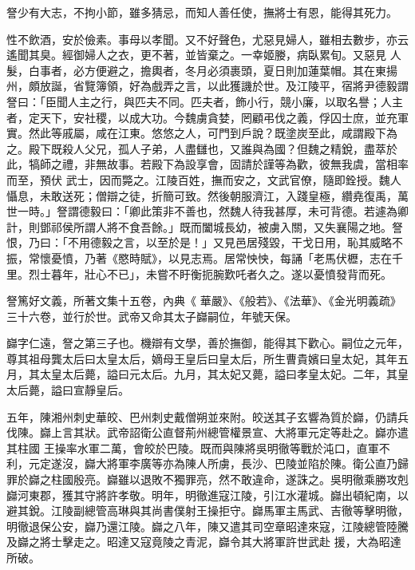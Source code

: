 \begin{pinyinscope}
 詧少有大志，不拘小節，雖多猜忌，而知人善任使，撫將士有恩，能得其死力。



 性不飲酒，安於儉素。事母以孝聞。又不好聲色，尤惡見婦人，雖相去數步，亦云遙聞其臭。經御婦人之衣，更不著，並皆棄之。一幸姬媵，病臥累旬。又惡見
 人髮，白事者，必方便避之，擔輿者，冬月必須裹頭，夏日則加蓮葉帽。其在東揚州，頗放誕，省覽簿領，好為戲弄之言，以此獲譏於世。及江陵平，宿將尹德毅謂詧曰：「臣聞人主之行，與匹夫不同。匹夫者，飾小行，競小廉，以取名譽；人主者，定天下，安社稷，以成大功。今魏虜貪婪，罔顧弔伐之義，俘囚士庶，並充軍實。然此等戚屬，咸在江東。悠悠之人，可門到戶說？既塗炭至此，咸謂殿下為之。殿下既殺人父兄，孤人子弟，人盡讎也，又誰與為國？但魏之精銳，盡萃於此，犒師之禮，非無故事。若殿下為設享會，固請於謹等為歡，彼無我虞，當相率而至，預伏
 武士，因而斃之。江陵百姓，撫而安之，文武官僚，隨即銓授。魏人懾息，未敢送死；僧辯之徒，折簡可致。然後朝服濟江，入踐皇極，纘堯復禹，萬世一時。」詧謂德毅曰：「卿此策非不善也，然魏人待我甚厚，未可背德。若遽為卿計，則鄧祁侯所謂人將不食吾餘。」既而闔城長幼，被虜入關，又失襄陽之地。詧恨，乃曰：「不用德毅之言，以至於是！」又見邑居殘毀，干戈日用，恥其威略不振，常懷憂憤，乃著《愍時賦》，以見志焉。居常怏怏，每誦「老馬伏櫪，志在千里。烈士暮年，壯心不已」，未嘗不盱衡扼腕歎吒者久之。遂以憂憤發背而死。



 詧篤好文義，所著文集十五卷，內典《
 華嚴》、《般若》、《法華》、《金光明義疏》三十六卷，並行於世。武帝又命其太子巋嗣位，年號天保。



 巋字仁遠，詧之第三子也。機辯有文學，善於撫御，能得其下歡心。嗣位之元年，尊其祖母龔太后曰太皇太后，嫡母王皇后曰皇太后，所生曹貴嬪曰皇太妃，其年五月，其太皇太后薨，謚曰元太后。九月，其太妃又薨，謚曰孝皇太妃。二年，其皇太后薨，謚曰宣靜皇后。



 五年，陳湘州刺史華皎、巴州刺史戴僧朔並來附。皎送其子玄響為質於巋，仍請兵伐陳。巋上言其狀。武帝詔衛公直督荊州總管權景宣、大將軍元定等赴之。巋亦遣其柱國
 王操率水軍二萬，會皎於巴陵。既而與陳將吳明徹等戰於沌口，直軍不利，元定遂沒，巋大將軍李廣等亦為陳人所虜，長沙、巴陵並陷於陳。衛公直乃歸罪於巋之柱國殷亮。巋雖以退敗不獨罪亮，然不敢違命，遂誅之。吳明徹乘勝攻剋巋河東郡，獲其守將許孝敬。明年，明徹進寇江陵，引江水灌城。巋出頓紀南，以避其銳。江陵副總管高琳與其尚書僕射王操拒守。巋馬軍主馬武、吉徹等擊明徹，明徹退保公安，巋乃還江陵。巋之八年，陳又遣其司空章昭達來寇，江陵總管陸騰及巋之將士擊走之。昭達又寇竟陵之青泥，巋令其大將軍許世武赴
 援，大為昭達所破。




\end{pinyinscope}
